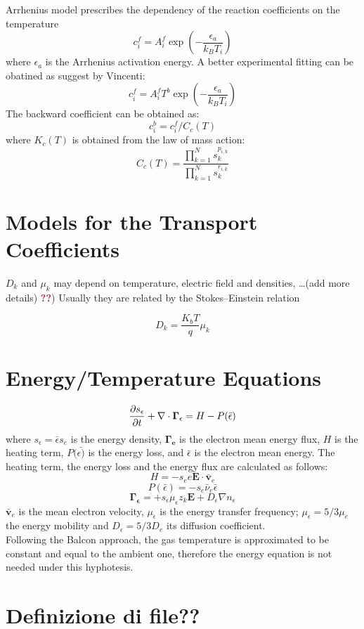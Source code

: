 \documentclass[11pt]{amsart}
\begin{document}
Arrhenius model prescribes the dependency of the reaction coefficients on the temperature
$$
c^{f}_i = A^{f}_{i} \exp\left( -\dfrac{\epsilon_a}{k_B T_{i}} \right)
$$
where $\epsilon_a$ is the Arrhenius activation energy.
A better experimental fitting can be obatined as suggest by Vincenti:
$$
c^{f}_i =A^{f}_{i} T^b \exp\left( -\dfrac{\epsilon_a}{k_B T_{i}} \right)
$$
The backward coefficient can be obtained as:
$$
c^{b}_i= c^{f}_i/C_c(T)  
$$
where $K_c(T)$ is obtained from the law of mass action:
$$
C_c(T)= \frac{\prod_{k=1}^N s_k^{p_{i,k}}}{\prod_{k=1}^N s_k^{r_{i,k}}}
$$

\section{Models for the Transport Coefficients}

$D_{k}$ and $\mu_{k}$ may depend on temperature, electric field and densities, \dots(add more details)
\textcolor{red}{\textbf{??}})
Usually they are related by the Stokes--Einstein relation 

$$
D_{k} = \dfrac{K_{b} T}{q} \mu_{k}
$$

\section{Energy/Temperature Equations}
$$
\frac{\partial s_\epsilon}{\partial t} + \nabla\cdot{\mathbf{{\Gamma_\epsilon}}} = H - P(\bar{\epsilon})
$$
where $s_\epsilon = \bar{\epsilon} s_e$ is the energy density, $\mathbf{\Gamma_e}$ is the electron mean energy flux, $H$ is the heating term, $P(\bar{\epsilon)}$ is the energy loss, and $\bar{\epsilon}$ is the electron mean energy.
The heating term, the energy loss and the energy flux are calculated as follows:
$$
H=-s_e e \mathbf{E} \cdot  \mathbf{\bar{v}}_e
$$ 
$$
P(\bar{\epsilon})=-s_e\bar{\nu}_e\bar{\epsilon}
$$
$$
\mathbf{\Gamma_\epsilon}= +s_\epsilon \mu_\epsilon z_k \mathbf{E} + D_\epsilon\nabla n_\epsilon
$$    
$\mathbf{\bar{v}}_e$ is the mean electron velocity, $\mu_\epsilon$ is the energy transfer frequency;
$\mu_\epsilon = 5/3\mu_e$ the energy mobility and $D_\epsilon = 5/3 D_e$ its diffusion coefficient.\\
Following the Balcon approach, the gas temperature is approximated to be constant and equal to the ambient one, therefore the energy equation is not needed under this hyphotesis.

\section{Definizione di file??}
\end{document}
